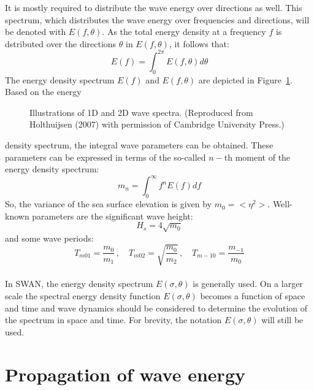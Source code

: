 \documentclass[12pt]{book}
\begin{document}
It is mostly required to distribute the wave energy over directions as well. This spectrum, which distributes
the wave energy over frequencies and directions, will be denoted with $E(f,\theta)$. As the total energy
density at a frequency $f$ is dstributed over the directions $\theta$ in $E(f,\theta)$, it follows that:
\begin{equation}
  E(f) = \int_{0}^{2\pi} E(f,\theta) d \theta
  \label{intro8}
\end{equation}
The energy density spectrum $E(f)$ and $E(f,\theta)$ are depicted in Figure~\ref{fig:spectra}. Based on the energy
\begin{figure}[htb]
   \centerline{
              }
      \caption{Illustrations of 1D and 2D wave spectra. (Reproduced from Holthuijsen (2007) with permission of
               Cambridge University Press.)}
      \label{fig:spectra}
\end{figure}
density spectrum, the integral wave parameters can be obtained. These parameters can be expressed in terms of the so-called
$n-$th moment of the energy density spectrum:
\begin{equation}
  m_n = \int_{0}^{\infty} f^n E(f) df
  \label{intro8-1}
\end{equation}
So, the variance of the sea surface elevation is given by $m_0 = <\eta^2>$. Well-known parameters are the significant
wave height:
\begin{equation}
  H_s = 4 \sqrt{m_0}
\end{equation}
and some wave periods:
\begin{equation}
  T_{m01} = \frac{m_0}{m_1}\, , \quad
  T_{m02} = \sqrt{\frac{m_0}{m_2}}\, , \quad
  T_{m-10} = \frac{m_{-1}}{m_0}
\end{equation}
\\[2ex]
\noindent
In SWAN, the energy density spectrum $E(\sigma,\theta)$ is generally used. On a larger scale the spectral energy density
function $E(\sigma,\theta)$ becomes a function of space and time and wave dynamics should be considered to determine
the evolution of the spectrum in space and time. For brevity, the notation $E(\sigma,\theta)$ will still be used.
\nocite{Hol07}

\section{Propagation of wave energy}
\end{document}

